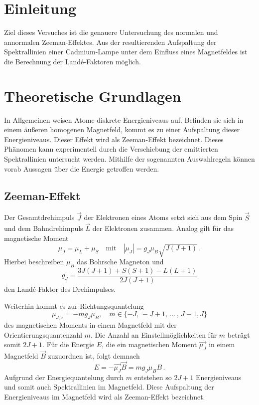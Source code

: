 \section{Einleitung}
Ziel dieses Versuches ist die genauere Untersuchung des normalen und annormalen Zeeman-Effektes.
Aus der resultierenden Aufspaltung der Spektrallinien einer Cadmium-Lampe unter dem Einfluss eines Magnetfeldes ist die Berechnung der Landé-Faktoren möglich. \\

\section{Theoretische Grundlagen}
In Allgemeinen weisen Atome diskrete Energieniveaus auf. Befinden sie sich in einem äußeren homogenen
Magnetfeld, kommt es zu einer Aufspaltung dieser Energieniveaus. Dieser Effekt wird als Zeeman-Effekt
bezeichnet. Dieses Phänomen kann experimentell durch die Verschiebung der emittierten Spektrallinien
untersucht werden. Mithilfe der sogenannten Auswahlregeln können vorab Aussagen über die
Energie getroffen werden.

\subsection{Zeeman-Effekt}
Der Gesamtdrehimpuls $\vec{J}$ der Elektronen eines Atoms setzt sich aus dem Spin $\vec{S}$ und dem Bahndrehimpuls $\vec{L}$ der Elektronen zusammen.
Analog gilt für das magnetische Moment
\begin{equation*}
  \mu_J = \mu_L + \mu_S \quad \text{mit} \quad |\mu_J| = g_J \mu_B \sqrt{J (J + 1)} \, .
\end{equation*}
Hierbei beschreiben $\mu_B$ das Bohrsche Magneton und
\begin{equation}\label{eqn:Lande}
  g_J = \frac{3J(J + 1) + S(S + 1) − L(L + 1)}{2J (J + 1)}
\end{equation}
den Landé-Faktor des Drehimpulses.

Weiterhin kommt es zur Richtungsquantelung
\begin{equation*}
  \mu_{J,z} = −m g_J \mu_B, \quad m \in \{ -J,\, -J+1, \, ... \, ,\, J-1, J \}
\end{equation*}
des magnetischen Moments in einem Magnetfeld mit der Orientierungsquantenzahl $m$.
Die Anzahl an Einstellmöglichkeiten für $m$ beträgt somit $2J+1$.
Für die Energie $E$, die ein magnetischen Moment $\vec{\mu_J}$ in einem Magnetfeld $\vec{B}$ zuzuordnen ist, folgt demnach
\begin{equation} \label{eqn:Melinaistdoof}
  E = -\vec{\mu_J} \vec{B} = m g_J \mu_B B \, .
\end{equation}
Aufgrund der Energiequantelung durch $m$ entstehen so $2J+1$  Energieniveaus und somit auch Spektrallinien im Magnetfeld.
Diese Aufspaltung der Energieniveaus im Magnetfeld wird als Zeeman-Effekt bezeichnet.

